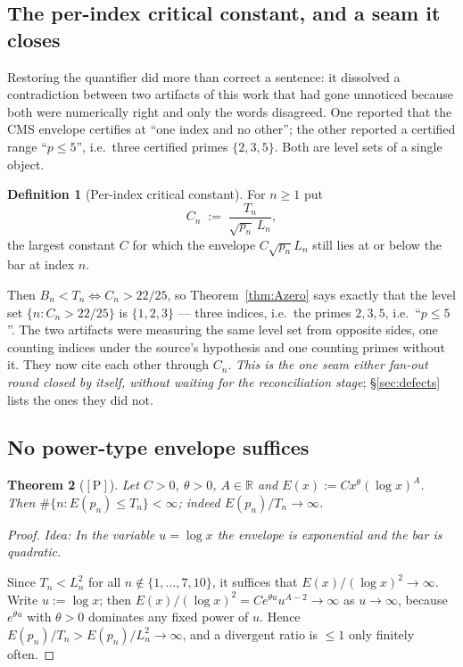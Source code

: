 \documentclass[11pt,a4paper]{article}
\theoremstyle{plain}
\newtheorem{theorem}{Theorem}[section]
\theoremstyle{definition}
\newtheorem{definition}[theorem]{Definition}
\theoremstyle{remark}
\newcommand{\idea}[1]{\emph{Idea: #1}\par\smallskip}
\newcommand{\cP}{{[\mathrm{P}]}}
\newcommand{\R}{\mathbb{R}}
\begin{document}
\subsection{The per-index critical constant, and a seam it closes}
\label{sec:critconst}

Restoring the quantifier did more than correct a sentence: it dissolved a contradiction between
two artifacts of this work that had gone unnoticed because both were numerically right and only
the words disagreed. One reported that the CMS envelope certifies at ``one index and no other'';
the other reported a certified range ``$p \le 5$'', i.e.\ three certified primes
$\{2,3,5\}$. Both are level sets of a single object.

\begin{definition}[Per-index critical constant]
\label{def:Cn}
For $n \ge 1$ put
\[
C_n \;:=\; \frac{T_n}{\sqrt{p_n}\,L_n} ,
\]
the largest constant $C$ for which the envelope $C\sqrt{p_n}L_n$ still lies at or below the bar
at index $n$.
\end{definition}

Then $B_n < T_n \iff C_n > 22/25$, so Theorem~\ref{thm:Azero} says exactly that the level set
$\{n : C_n > 22/25\}$ is $\{1,2,3\}$ --- three indices, i.e.\ the primes $2, 3, 5$, i.e.\ ``$p
\le 5$''. The two artifacts were measuring the same level set from opposite sides, one counting
indices under the source's hypothesis and one counting primes without it. They now cite each
other through $C_n$. \emph{This is the one seam either fan-out round closed by itself, without
waiting for the reconciliation stage};
\S\ref{sec:defects} lists the ones they did not.

\subsection{No power-type envelope suffices}

\begin{theorem}[$\cP$]
\label{thm:Bpow}
Let $C > 0$, $\theta > 0$, $A \in \R$ and $E(x) := C x^\theta (\log x)^A$. Then
$\#\{n : E(p_n) \le T_n\} < \infty$; indeed $E(p_n)/T_n \to \infty$.
\end{theorem}

\begin{proof}
\idea{In the variable $u = \log x$ the envelope is exponential and the bar is quadratic.}
Since $T_n < L_n^2$ for all $n \notin \{1,\dots,7,10\}$, it suffices that
$E(x)/(\log x)^2 \to \infty$. Write $u := \log x$; then
$E(x)/(\log x)^2 = C e^{\theta u} u^{A-2} \to \infty$ as $u \to \infty$, because $e^{\theta u}$
with $\theta > 0$ dominates any fixed power of $u$. Hence
$E(p_n)/T_n > E(p_n)/L_n^2 \to \infty$, and a divergent ratio is $\le 1$ only finitely often.
\end{proof}
\end{document}
